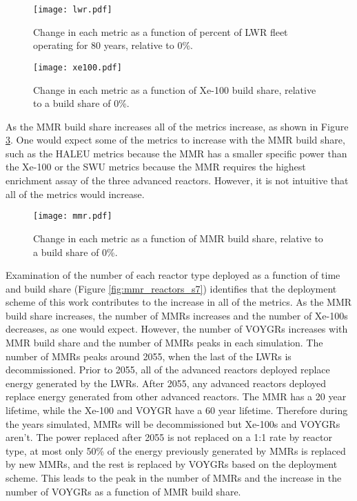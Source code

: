 \begin{figure}
    \centering
    \texttt{[image: lwr.pdf]}
    \caption{Change in each metric as a function of percent of LWR fleet  
    operating for 80 years, relative to 0\%.}
    \label{fig:lwr_scenario7}
\end{figure}
\begin{figure}
    \centering
    \texttt{[image: xe100.pdf]}
    \caption{Change in each metric as a function of Xe-100 build share, 
    relative to a build share of 0\%.}
    \label{fig:xe100_scenario7}
\end{figure}

As the \gls{MMR} build share increases all of the metrics increase, as shown 
in Figure \ref{fig:mmr_scenario7}. One would expect some of the metrics 
to increase with the \gls{MMR} build share, such as the \gls{HALEU} metrics 
because the \gls{MMR} has a smaller specific power than the Xe-100 or the 
\gls{SWU} metrics because the \gls{MMR} requires the highest enrichment 
assay of the three advanced reactors. However, it is not intuitive that 
all of the metrics would increase. 
\begin{figure}
    \centering
    \texttt{[image: mmr.pdf]}
    \caption{Change in each metric as a function of MMR build share, 
    relative to a build share of 0\%.}
    \label{fig:mmr_scenario7}
\end{figure}

Examination of the number of each reactor type deployed as a function 
of time and build share (Figure \ref{fig:mmr_reactors_s7}) identifies 
that the deployment scheme of this work contributes to the increase 
in all of the metrics. As the \gls{MMR} build share increases, the number of 
\glspl{MMR} increases and the number of Xe-100s decreases, as one would 
expect. However, the number of VOYGRs increases with \gls{MMR} build share 
and the number of \glspl{MMR} peaks in each simulation. The number of 
\glspl{MMR} peaks around 2055, when the last of the \glspl{LWR} is decommissioned.
Prior to 2055, all of the advanced reactors deployed replace energy generated 
by the \glspl{LWR}. After 2055, any advanced reactors deployed replace 
energy generated from other advanced reactors. The \gls{MMR} has a 20 year 
lifetime, while the Xe-100 and VOYGR have a 60 year lifetime. Therefore during 
the years simulated, \glspl{MMR} will be decommissioned but Xe-100s and VOYGRs 
aren't. The power replaced after 2055 is not replaced on a 1:1 rate by 
reactor type, at most only 50\% of the energy previously generated by 
\glspl{MMR} is replaced by new \glspl{MMR}, and the rest is replaced by VOYGRs 
based on the deployment scheme. This leads to the peak in the number of 
\glspl{MMR} and the increase in the number of VOYGRs as a function of 
\gls{MMR} build share. 

